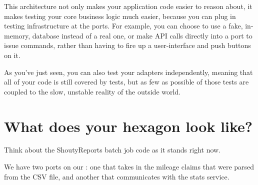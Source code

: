 This architecture not only makes your application code easier to reason about, it makes testing your core business logic much easier, because you can plug in testing infrastructure at the ports. For example, you can choose to use a fake, in-memory, database instead of a real one, or make API calls directly into a port to issue commands, rather than having to fire up a user-interface and push buttons on it.

As you've just seen, you can also test your adapters independently, meaning that all of your code is still covered by tests, but as few as possible of those tests are coupled to the slow, unstable reality of the outside world.


\section*{What does your hexagon look like?}

Think about the ShoutyReports batch job code as it stands right now. 


We have two ports on our \texttt{\ShoutyReportProcessor}: one that takes in the mileage claims that were parsed from the CSV file, and another that communicates with the stats service.


